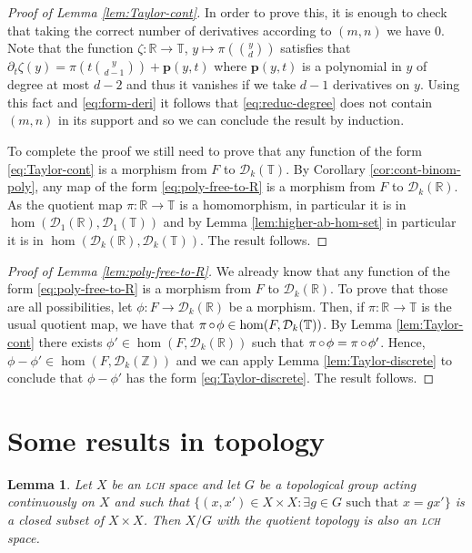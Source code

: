 \documentclass[a4paper,12pt,reqno]{amsart}
\newtheorem{lemma}[theorem]{Lemma}
\theoremstyle{definition}
\def\to{\rightarrow}
\newcommand{\mc}{\mathcal}
\newcommand{\mb}{\mathbb}
\DeclareMathOperator{\co}{\circ\hspace{-0.02 cm}}
\begin{document}
\begin{proof}[Proof of Lemma \ref{lem:Taylor-cont}]
In order to prove this, it is enough to check that taking the correct number of derivatives according to $(m,n)$ we have 0. Note that the function $\zeta:\mb{R}\to \mb{T}$, $y\mapsto \pi\left(\binom{y}{d}\right)$ satisfies that $\partial_t\zeta(y) = \pi\left(t\binom{y}{d-1}\right)+\textbf{p}(y,t)$ where $\textbf{p}(y,t)$ is a polynomial in $y$ of degree at most $d-2$ and thus it vanishes if we take $d-1$ derivatives on $y$. Using this fact and  \eqref{eq:form-deri} it follows that \eqref{eq:reduc-degree} does not contain $(m,n)$ in its support and so we can conclude the result by induction.

To complete the proof we still need to prove that any function of the form \eqref{eq:Taylor-cont} is a morphism from $F$ to $\mc{D}_k(\mb{T})$. By Corollary \ref{cor:cont-binom-poly}, any map of the form \eqref{eq:poly-free-to-R} is a morphism from $F$ to $\mc{D}_k(\mb{R})$. As the quotient map $\pi:\mb{R}\to \mb{T}$ is a homomorphism, in particular it is in $\hom(\mc{D}_1(\mb{R}),\mc{D}_1(\mb{T}))$ and by Lemma \ref{lem:higher-ab-hom-set} in particular it is in $\hom(\mc{D}_k(\mb{R}),\mc{D}_k(\mb{T}))$. The result follows.
\end{proof}

\begin{proof}[Proof of Lemma \ref{lem:poly-free-to-R}]
We already know that any function of the form \eqref{eq:poly-free-to-R} is a morphism from $F$ to $\mc{D}_k(\mb{R})$. To prove that those are all possibilities, let $\phi:F\to \mc{D}_k(\mb{R})$ be a morphism. Then, if $\pi:\mb{R}\to \mb{T}$ is the usual quotient map, we have that $\pi\co \phi\in \hom(F,\mc{D}_k(\mb{T}))$. By Lemma \ref{lem:Taylor-cont} there exists $\phi'\in \hom(F,\mc{D}_k(\mb{R}))$ such that $\pi\co \phi = \pi\co \phi'$. Hence, $\phi-\phi'\in \hom(F,\mc{D}_k(\mb{Z}))$ and we can apply Lemma \ref{lem:Taylor-discrete} to conclude that $\phi-\phi'$ has the form \eqref{eq:Taylor-discrete}. The result follows.
\end{proof}

\section{Some results in topology}

\begin{lemma}\label{lem:quo-by-cont-gr-act}
Let $X$ be an \textsc{lch} space and let $G$ be a topological group acting continuously on $X$ and such that $\{(x,x')\in X\times X:\exists g\in G \text{ such that }x=gx'\}$ is a closed subset of $X\times X$. Then $X/G$ with the quotient topology is also an \textsc{lch} space.
\end{lemma}
\end{document}
